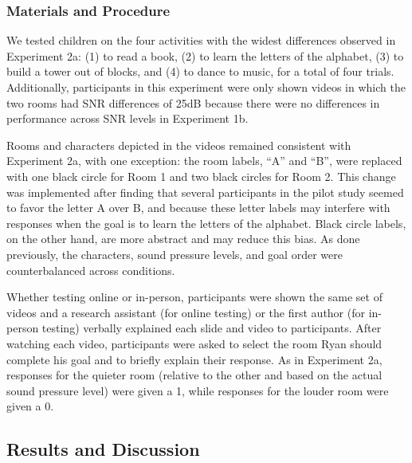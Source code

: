 \documentclass[10pt, letterpaper]{article}
\begin{document}
\hypertarget{materials-and-procedure-3}{%
\subsubsection{Materials and
Procedure}\label{materials-and-procedure-3}}

We tested children on the four activities with the widest differences
observed in Experiment 2a: (1) to read a book, (2) to learn the letters
of the alphabet, (3) to build a tower out of blocks, and (4) to dance to
music, for a total of four trials. Additionally, participants in this
experiment were only shown videos in which the two rooms had SNR
differences of 25dB because there were no differences in performance
across SNR levels in Experiment 1b.

Rooms and characters depicted in the videos remained consistent with
Experiment 2a, with one exception: the room labels, ``A'' and ``B'',
were replaced with one black circle for Room 1 and two black circles for
Room 2. This change was implemented after finding that several
participants in the pilot study seemed to favor the letter A over B, and
because these letter labels may interfere with responses when the goal
is to learn the letters of the alphabet. Black circle labels, on the
other hand, are more abstract and may reduce this bias. As done
previously, the characters, sound pressure levels, and goal order were
counterbalanced across conditions.

Whether testing online or in-person, participants were shown the same
set of videos and a research assistant (for online testing) or the first
author (for in-person testing) verbally explained each slide and video
to participants. After watching each video, participants were asked to
select the room Ryan should complete his goal and to briefly explain
their response. As in Experiment 2a, responses for the quieter room
(relative to the other and based on the actual sound pressure level)
were given a 1, while responses for the louder room were given a 0.

\hypertarget{results-and-discussion-3}{%
\subsection{Results and Discussion}\label{results-and-discussion-3}}
\end{document}
